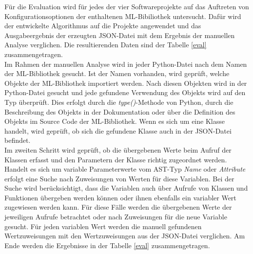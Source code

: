 \documentclass[german,bachelor]{swsLeipzig}
\begin{document}
Für die Evaluation wird für jedes der vier Softwareprojekte auf das Auftreten von Konfigurationsoptionen der enthaltenen ML-Bibiliothek
untersucht.
Dafür wird der entwickelte Algorithmus auf die Projekte angewendet und das Ausgabeergebnis der erzeugten JSON-Datei mit
dem Ergebnis der manuellen Analyse verglichen.
Die resultierenden Daten sind der Tabelle \ref{eval} zusammengetragen. \\

Im Rahmen der manuellen Analyse wird in jeder Python-Datei nach dem Namen der ML-Bibliothek gesucht.
Ist der Namen vorhanden, wird geprüft, welche Objekte der ML-Bibliothek importiert werden.
Nach diesen Objekten wird in der Python-Datei gesucht und jede gefundene Verwendung des Objekts wird auf den Typ überprüft.
Dies erfolgt durch die \textit{type()}-Methode von Python, durch die Beschreibung des Objekts in der Dokumentation
oder über die Definition des Objekts im Source Code der ML-Bibliothek.
Wenn es sich um eine Klasse handelt, wird geprüft, ob sich die gefundene Klasse auch in der JSON-Datei
befindet. \\

Im zweiten Schritt wird geprüft, ob die übergebenen Werte beim Aufruf der Klassen erfasst und den Parametern der
Klasse richtig zugeordnet werden.
Handelt es sich um variable Parameterwerte vom AST-Typ \textit{Name} oder \textit{Attribute} erfolgt eine Suche nach Zuweisungen
von Werten für diese Variablen.
Bei der Suche wird berücksichtigt, dass die Variablen auch über Aufrufe von Klassen und Funktionen übergeben werden können oder ihnen ebenfalls ein
variabler Wert zugewiesen werden kann.
Für diese Fälle werden die übergebenen Werte der jeweiligen Aufrufe betrachtet oder nach Zuweisungen für die neue Variable gesucht.
Für jeden variablen Wert werden die manuell gefundenen Wertzuweisungen mit den Wertzuweisungen aus der JSON-Datei verglichen.
Am Ende werden die Ergebnisse in der Tabelle \ref{eval} zusammengetragen.
\end{document}
